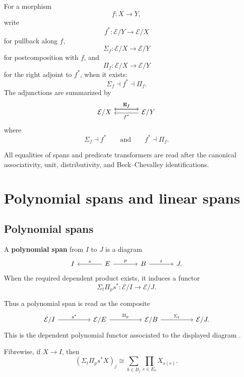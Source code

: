 For a morphism
\[
f:X\to Y,
\]
write
\[
f^\ast:\mathcal E/Y\to\mathcal E/X
\]
for pullback along \(f\),
\[
\Sigma_f:\mathcal E/X\to\mathcal E/Y
\]
for postcomposition with \(f\), and
\[
\Pi_f:\mathcal E/X\to\mathcal E/Y
\]
for the right adjoint to \(f^\ast\), when it exists:
\[
\Sigma_f\dashv f^\ast\dashv\Pi_f.
\]
The adjunctions are summarized by
\[
\begin{tikzcd}[column sep=large]
\mathcal E/X
  \arrow[r,shift left=1.1ex,"\Sigma_f"]
&
\mathcal E/Y
  \arrow[l,shift left=.2ex,"f^\ast"]
  \arrow[l,shift right=1.1ex,"\Pi_f"']
\end{tikzcd}
\]
where
\[
\Sigma_f\dashv f^\ast
\qquad\text{and}\qquad
f^\ast\dashv\Pi_f.
\]

All equalities of spans and predicate transformers are read after the
canonical associativity, unit, distributivity, and Beck--Chevalley
identifications.

\section{Polynomial spans and linear spans}
\label{sec:poly-relative-polynomial-spans}

\subsection{Polynomial spans}
\label{subsec:poly-relative-polynomial-spans}

\begin{definition}
\label{def:poly-relative-polynomial-span}
A \textbf{polynomial span} from \(I\) to \(J\) is a diagram
\[
\begin{tikzcd}[column sep=large]
I
&
E
  \arrow[l,"s"']
  \arrow[r,"p"]
&
B
  \arrow[r,"t"]
&
J.
\end{tikzcd}
\]
When the required dependent product exists, it induces a functor
\[
\Sigma_t\Pi_p s^\ast:
\mathcal E/I\to\mathcal E/J.
\]
\end{definition}

Thus a polynomial span is read as the composite
\[
\begin{tikzcd}[column sep=huge]
\mathcal E/I
  \arrow[r,"s^\ast"]
&
\mathcal E/E
  \arrow[r,"\Pi_p"]
&
\mathcal E/B
  \arrow[r,"\Sigma_t"]
&
\mathcal E/J .
\end{tikzcd}
\]
This is the dependent polynomial functor associated to the displayed diagram
\cite{GambinoKock2013Polynomial}.

Fibrewise, if \(X\to I\), then
\[
\left(\Sigma_t\Pi_p s^\ast X\right)_j
\cong
\sum_{b\in B_j}
\prod_{e\in E_b}
X_{s(e)}.
\]

